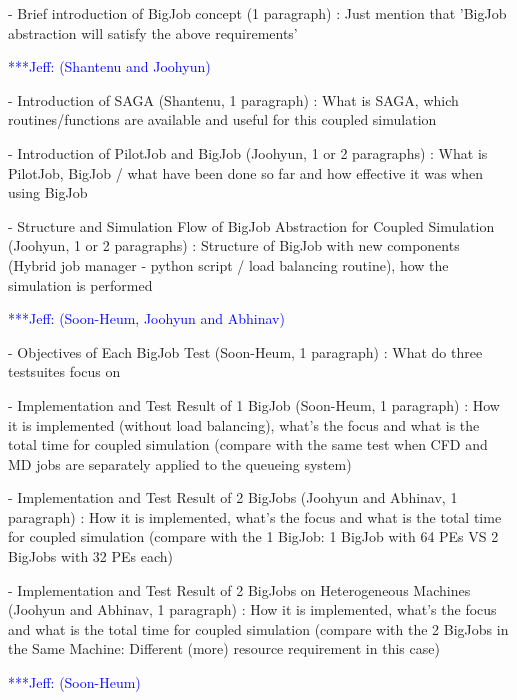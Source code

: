 \documentclass[times, 10pt,twocolumn]{article}
\newcommand{\skonote}[1]{ {\textcolor{blue} { ***Jeff: #1 }}}
\newcommand{\skonote}[1]{}
\begin{document}
- Brief introduction of BigJob concept (1 paragraph)
: Just mention that 'BigJob abstraction will satisfy the above requirements'


\skonote{(Shantenu and Joohyun)}

- Introduction of SAGA (Shantenu, 1 paragraph)
: What is SAGA, which routines/functions are available and useful for this coupled simulation

- Introduction of PilotJob and BigJob (Joohyun, 1 or 2 paragraphs)
: What is PilotJob, BigJob / what have been done so far and how effective it was when using BigJob

- Structure and Simulation Flow of BigJob Abstraction for Coupled Simulation (Joohyun, 1 or 2 paragraphs)
: Structure of BigJob with new components (Hybrid job manager - python script / load balancing routine), how the simulation is performed


\skonote{(Soon-Heum, Joohyun and Abhinav)}

- Objectives of Each BigJob Test (Soon-Heum, 1 paragraph)
: What do three testsuites focus on

- Implementation and Test Result of 1 BigJob (Soon-Heum, 1 paragraph)
: How it is implemented (without load balancing), what's the focus and what is the total time for coupled simulation (compare with the same test when CFD and MD jobs are separately applied to the queueing system)

- Implementation and Test Result of 2 BigJobs (Joohyun and Abhinav, 1 paragraph)
: How it is implemented, what's the focus and what is the total time for coupled simulation (compare with the 1 BigJob: 1 BigJob with 64 PEs VS 2 BigJobs with 32 PEs each)

- Implementation and Test Result of 2 BigJobs on Heterogeneous Machines (Joohyun and Abhinav, 1 paragraph)
: How it is implemented, what's the focus and what is the total time for coupled simulation (compare with the 2 BigJobs in the Same Machine: Different (more) resource requirement in this case) 


\skonote{(Soon-Heum)}
\end{document}
